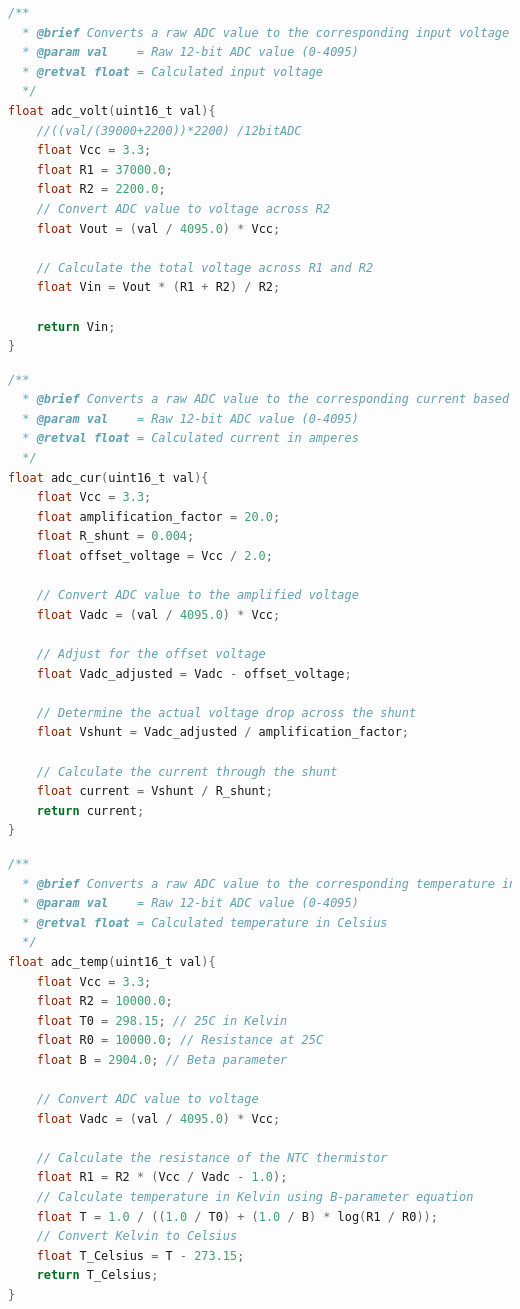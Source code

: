 \documentclass[paper=a4,11pt]{scrreprt}
\begin{document}
\begin{lstlisting}[language=C, caption=\textbf{float adc\_volt(uint16\_t val)},label={adcV}, mathescape=true, breaklines=true]
/**
  * @brief Converts a raw ADC value to the corresponding input voltage
  * @param val    = Raw 12-bit ADC value (0-4095)
  * @retval float = Calculated input voltage
  */
float adc_volt(uint16_t val){
	//((val/(39000+2200))*2200) /12bitADC
    float Vcc = 3.3;
    float R1 = 37000.0;
    float R2 = 2200.0;
    // Convert ADC value to voltage across R2
    float Vout = (val / 4095.0) * Vcc;

    // Calculate the total voltage across R1 and R2
    float Vin = Vout * (R1 + R2) / R2;

    return Vin;
}
\end{lstlisting}
\newpage
\begin{lstlisting}[language=C, caption=\textbf{float adc\_cur(uint16\_t val)},label={adcC}, mathescape=true, breaklines=true]
/**
  * @brief Converts a raw ADC value to the corresponding current based on shunt resistor and amplification factor
  * @param val    = Raw 12-bit ADC value (0-4095)
  * @retval float = Calculated current in amperes
  */
float adc_cur(uint16_t val){
    float Vcc = 3.3;
    float amplification_factor = 20.0;
    float R_shunt = 0.004;
    float offset_voltage = Vcc / 2.0;

    // Convert ADC value to the amplified voltage
    float Vadc = (val / 4095.0) * Vcc;

    // Adjust for the offset voltage
    float Vadc_adjusted = Vadc - offset_voltage;

    // Determine the actual voltage drop across the shunt
    float Vshunt = Vadc_adjusted / amplification_factor;

    // Calculate the current through the shunt
    float current = Vshunt / R_shunt;
    return current;
}
\end{lstlisting}

\begin{lstlisting}[language=C, caption=\textbf{float adc\_temp(uint16\_t val)},label={adcT}, mathescape=true, breaklines=true]
/**
  * @brief Converts a raw ADC value to the corresponding temperature in Celsius using an NTC thermistor
  * @param val    = Raw 12-bit ADC value (0-4095)
  * @retval float = Calculated temperature in Celsius
  */
float adc_temp(uint16_t val){
    float Vcc = 3.3;
    float R2 = 10000.0;
    float T0 = 298.15; // 25C in Kelvin
    float R0 = 10000.0; // Resistance at 25C
    float B = 2904.0; // Beta parameter

    // Convert ADC value to voltage
    float Vadc = (val / 4095.0) * Vcc;

    // Calculate the resistance of the NTC thermistor
    float R1 = R2 * (Vcc / Vadc - 1.0);
    // Calculate temperature in Kelvin using B-parameter equation
    float T = 1.0 / ((1.0 / T0) + (1.0 / B) * log(R1 / R0));
    // Convert Kelvin to Celsius
    float T_Celsius = T - 273.15;
    return T_Celsius;
}
\end{lstlisting}
\end{document}

